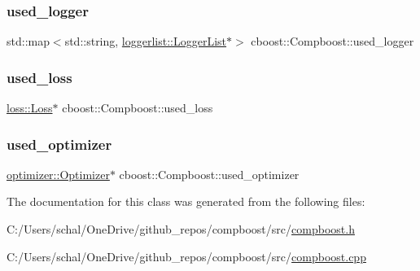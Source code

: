 \subsubsection{\texorpdfstring{used\+\_\+logger}{used\_logger}}
{\footnotesize\ttfamily std\+::map$<$std\+::string, \mbox{\hyperlink{classloggerlist_1_1_logger_list}{loggerlist\+::\+Logger\+List}}$\ast$$>$ cboost\+::\+Compboost\+::used\+\_\+logger\hspace{0.3cm}{\ttfamily [private]}}

\mbox{\label{classcboost_1_1_compboost_a9c776faf5e9b9e99b5241f2a650d5242}} 
\subsubsection{\texorpdfstring{used\+\_\+loss}{used\_loss}}
{\footnotesize\ttfamily \mbox{\hyperlink{classloss_1_1_loss}{loss\+::\+Loss}}$\ast$ cboost\+::\+Compboost\+::used\+\_\+loss\hspace{0.3cm}{\ttfamily [private]}}

\mbox{\label{classcboost_1_1_compboost_a6c0311a05cf6128b4c76fabbc432b807}} 
\subsubsection{\texorpdfstring{used\+\_\+optimizer}{used\_optimizer}}
{\footnotesize\ttfamily \mbox{\hyperlink{classoptimizer_1_1_optimizer}{optimizer\+::\+Optimizer}}$\ast$ cboost\+::\+Compboost\+::used\+\_\+optimizer\hspace{0.3cm}{\ttfamily [private]}}



The documentation for this class was generated from the following files\+:\begin{DoxyCompactItemize}
\item 
C\+:/\+Users/schal/\+One\+Drive/github\+\_\+repos/compboost/src/\mbox{\hyperlink{compboost_8h}{compboost.\+h}}\item 
C\+:/\+Users/schal/\+One\+Drive/github\+\_\+repos/compboost/src/\mbox{\hyperlink{compboost_8cpp}{compboost.\+cpp}}\end{DoxyCompactItemize}
